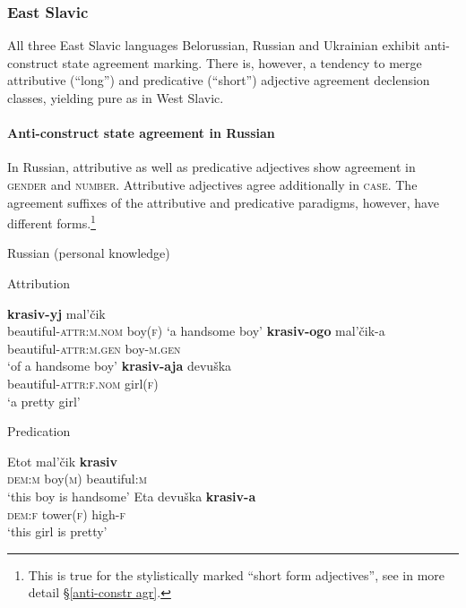 \subsubsection{East Slavic}
All three East Slavic languages Belorussian, Russian and Ukrainian exhibit anti\hyp{}construct state agreement marking. There is, however, a tendency to merge attributive (“long”) and predicative (“short”) adjective agreement declension classes, yielding pure  as in West Slavic.

\paragraph*{Anti\hyp{}construct state agreement in Russian}
\label{russian synchr}
In Russian, attributive as well as predicative adjectives show agreement in \textsc{gender} and \textsc{number}. Attributive adjectives agree additionally in \textsc{case}. The agreement suffixes of the attributive and predicative paradigms, however, have different forms.\footnote{This is true for the stylistically marked “short form adjectives”, see in more detail \S\ref{anti-constr agr}.}
\begin{exe}
\ex \rm{Russian (personal knowledge)}
\label{ru agr}
\begin{xlist}
\ex \rm{Attribution}
\label{ru attr}
\begin{xlist}
\ex	\textbf{krasiv-yj}			mal'čik\\
	beautiful-\textsc{attr:m.nom} 	boy(\textsc{f})
\glt	‘a handsome boy’
\ex	
\gll	\textbf{krasiv-ogo}			mal'čik-a\\
	beautiful-\textsc{attr:m.gen}	boy-\textsc{m.gen}\\
\glt	‘of a handsome boy’
\ex
\gll 	\textbf{krasiv-aja} 			devuška\\
	beautiful-\textsc{attr:f.nom}	girl(\textsc{f})\\
\glt	 ‘a pretty girl’
\end{xlist}
\ex \rm{Predication}
\begin{xlist}
\ex
\gll 	Etot 			mal'čik		\textbf{krasiv}\\
	\textsc{dem:m} boy(\textsc{m}) 	beautiful:\textsc{m}\\
\glt	 ‘this boy is handsome’
\ex	
\gll	Eta 			devuška		\textbf{krasiv-a}\\
	\textsc{dem:f} tower(\textsc{f}) 	high-\textsc{f}\\
\glt	‘this girl is pretty’
\end{xlist}
\end{xlist}
\end{exe}
